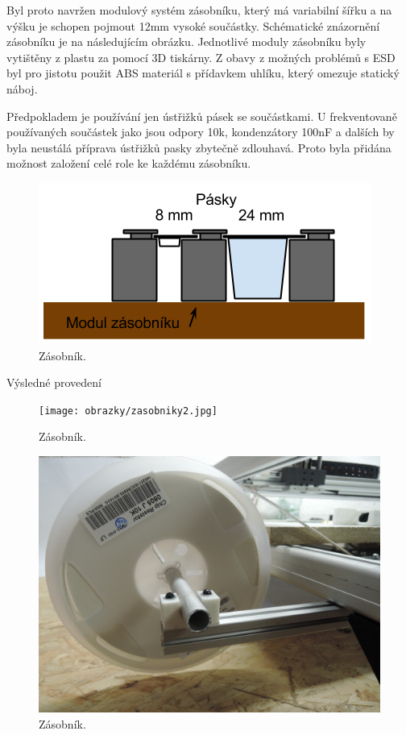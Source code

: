 Byl proto navržen modulový systém zásobníku, který má variabilní šířku a na výšku je schopen pojmout 12mm vysoké součástky. Schématické znázornění zásobníku je na následujícím obrázku. Jednotlivé moduly zásobníku byly vytištěny z plastu za pomocí 3D tiskárny. Z obavy z možných problémů s ESD byl pro jistotu použit ABS materiál s přídavkem uhlíku, který omezuje statický náboj.

Předpokladem je používání jen ústřižků pásek se součástkami. U frekventovaně používaných součástek jako jsou odpory 10k, kondenzátory 100nF a dalších by byla neustálá příprava ústřižků pasky zbytečně zdlouhavá. Proto byla přidána možnost založení celé role ke každému zásobníku.  

\begin{figure}[h!]
  \centering
    \includegraphics{obrazky/zasobnik.png}%
    \caption{Zásobník.}
    \label{fig:zasobnik}
\end{figure}



Výsledné provedení 
\begin{figure}[h!]
  \centering
    \texttt{[image: obrazky/zasobniky2.jpg]}%
    \caption{Zásobník.}
    \label{fig:zasobniky}
\end{figure}

\begin{figure}[h!]
  \centering
    \includegraphics[width=0.85\linewidth]{obrazky/role.jpg}%
    \caption{Zásobník.}
    \label{fig:role}
\end{figure}

